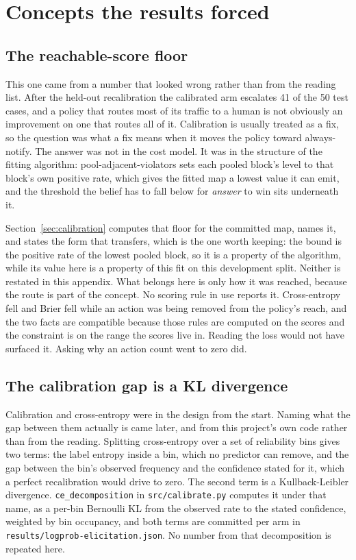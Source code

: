\documentclass{article}
\begin{document}
\section{Concepts the results forced}
\label{app:found}

\subsection{The reachable-score floor}

This one came from a number that looked wrong rather than from the reading list.
After the held-out recalibration the calibrated arm escalates 41 of the 50 test
cases, and a policy that routes most of its traffic to a human is not obviously an
improvement on one that routes all of it. Calibration is usually treated as a fix, so
the question was what a fix means when it moves the policy toward always-notify. The
answer was not in the cost model. It was in the structure of the fitting algorithm:
pool-adjacent-violators sets each pooled block's level to that block's own positive
rate, which gives the fitted map a lowest value it can emit, and the threshold the
belief has to fall below for \emph{answer} to win sits underneath it.

Section~\ref{sec:calibration} computes that floor for the committed map, names it,
and states the form that transfers, which is the one worth keeping: the bound is the
positive rate of the lowest pooled block, so it is a property of the algorithm, while
its value here is a property of this fit on this development split. Neither is
restated in this appendix. What belongs here is only how it was reached, because the
route is part of the concept. No scoring rule in use
reports it. Cross-entropy fell and Brier fell while an action was being removed from
the policy's reach, and the two facts are compatible because those rules are
computed on the scores and the constraint is on the range the scores live in. Reading
the loss would not have surfaced it. Asking why an action count went to zero did.

\subsection{The calibration gap is a KL divergence}

Calibration and cross-entropy were in the design from the start. Naming what the gap
between them actually is came later, and from this project's own code rather than from
the reading. Splitting cross-entropy over a set of reliability bins gives two terms:
the label entropy inside a bin, which no predictor can remove, and the gap between the
bin's observed frequency and the confidence stated for it, which a perfect
recalibration would drive to zero. The second term is a Kullback-Leibler
divergence. \texttt{ce\_decomposition} in \texttt{src/calibrate.py} computes it under
that name, as a per-bin Bernoulli KL from the observed rate to the stated
confidence, weighted by bin occupancy, and both terms are committed per arm in
\texttt{results/logprob-elicitation.json}. No number from that decomposition is
repeated here.
\end{document}
